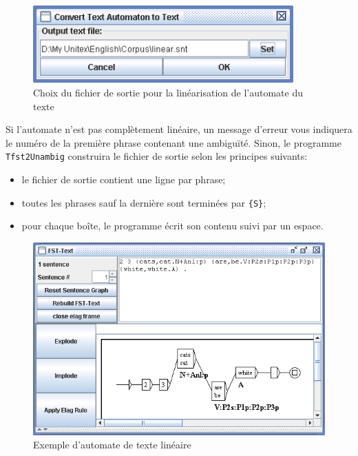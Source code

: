 \begin{figure}[!ht]
\begin{center}
\includegraphics[width=10cm]{resources/img/fig7-25.png}
\caption{Choix du fichier de sortie pour la linéarisation de l’automate du texte\label{fig-linearization-configuration}}
\end{center}
\end{figure}

\bigskip
\noindent Si l’automate n’est pas complètement linéaire, un message d’erreur vous indiquera
le numéro de la première phrase contenant une ambiguïté. Sinon, le programme \verb+Tfst2Unambig+ 
construira le fichier de sortie selon les principes suivants:

\begin{itemize}
  \item le fichier de sortie contient une ligne par phrase;
  \item toutes les phrases sauf la dernière sont terminées par \verb+{S}+;
  \item pour chaque boîte, le programme écrit son contenu suivi par un espace.
\end{itemize}

\begin{figure}[!ht]
\begin{center}
\includegraphics[width=12cm]{resources/img/fig7-26.png}
\caption{Exemple d’automate de texte linéaire\label{fig-linear-automaton}}
\end{center}
\end{figure}

